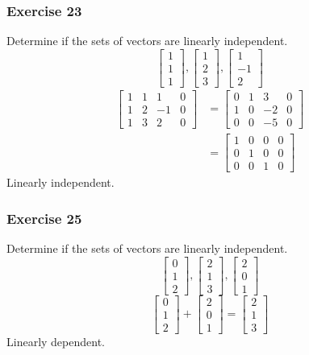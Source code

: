 \documentclass[letterpaper, 12pt]{math}
\begin{document}
\subsubsection*{Exercise 23}
Determine if the sets of vectors are linearly independent.
\[ \begin{bmatrix}1 \\ 1 \\ 1\end{bmatrix},
  \begin{bmatrix}1 \\ 2 \\ 3\end{bmatrix},
  \begin{bmatrix}1 \\ -1 \\ 2\end{bmatrix} \]
\begin{align*}
  \begin{bmatrix}
    1 & 1 & 1 & 0 \\
    1 & 2 & -1 & 0 \\
    1 & 3 & 2 & 0
  \end{bmatrix} &= \begin{bmatrix}
    0 & 1 & 3 & 0 \\
    1 & 0 & -2 & 0 \\
    0 & 0 & -5 & 0
  \end{bmatrix} \\
  &= \begin{bmatrix}
    1 & 0 & 0 & 0 \\
    0 & 1 & 0 & 0 \\
    0 & 0 & 1 & 0
  \end{bmatrix}
\end{align*}
Linearly independent.

\subsubsection*{Exercise 25}
Determine if the sets of vectors are linearly independent.
\[ \begin{bmatrix}0 \\ 1 \\ 2\end{bmatrix},
  \begin{bmatrix}2 \\ 1 \\ 3\end{bmatrix},
  \begin{bmatrix}2 \\ 0 \\ 1\end{bmatrix} \]
\[ \begin{bmatrix}0 \\ 1 \\ 2\end{bmatrix}+
  \begin{bmatrix}2 \\ 0 \\ 1\end{bmatrix} =
  \begin{bmatrix}2 \\ 1 \\ 3\end{bmatrix} \]
Linearly dependent.
\end{document}
